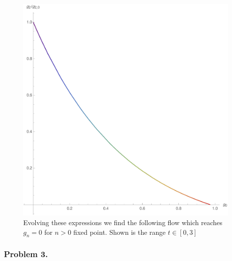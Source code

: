 \documentclass[12pt]{article}
\begin{document}
\begin{figure}
\begin{center}
\includegraphics[scale=0.5]{4_3_1_2}
\caption{Evolving these expressions we find the following flow which reaches $g_n = 0$ for $n > 0$ fixed point. Shown is the range $t \in [0, 3]$}
\end{center}
\end{figure}

\subsubsection{Problem 3.}
\end{document}
